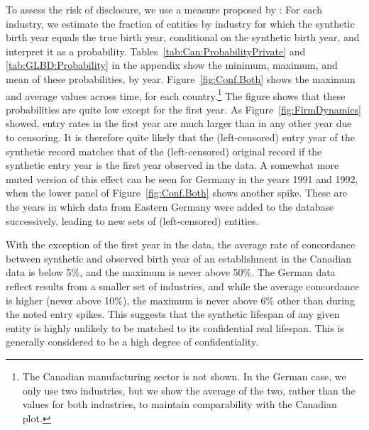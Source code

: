 
To assess the risk of disclosure, we use a measure proposed by \citep{KinneyEtAl2011}: For each industry, we estimate the fraction of entities by industry for which the synthetic birth year equals the true birth year, conditional on the synthetic birth year, and interpret it as a probability. Tables~\ref{tab:Can:ProbabilityPrivate} and \ref{tab:GLBD:Probability} in the appendix show the minimum, maximum, and mean of these probabilities, by year. Figure~\ref{fig:Conf.Both} shows the maximum and average values across time, for each country.\footnote{The Canadian manufacturing sector is not shown. In the German case, we only use two industries, but we show the average of the two, rather than the values for both industries, to maintain comparability with the Canadian plot.} The figure shows that these probabilities are quite low except for the first year. As Figure~\ref{fig:FirmDynamics} showed, entry rates in the first year are much larger than in any other year due to censoring. It is therefore quite likely that the (left-censored) entry year of the synthetic record matches that of the (left-censored) original record if the synthetic entry year is the first year observed in the data. A somewhat more muted version of this effect can be seen for Germany in the years 1991 and 1992, when the lower panel of %
Figure~\ref{fig:Conf.Both} shows another spike. These are the years in which data from Eastern Germany were added to the database successively, leading to new sets of (left-censored) entities. 

With the exception of the first year in the data, the average rate of concordance between synthetic and observed birth year of an establishment in the Canadian data is below 5\%, and the maximum is never above 50\%. The German data reflect results from a smaller set of industries, and while the average concordance is higher (never above 10\%), the maximum is never above 6\% other than during the noted entry spikes. This suggests that the synthetic lifespan of any given entity is highly unlikely to be matched to its confidential real lifespan. This is generally considered to be a high degree of confidentiality. 







